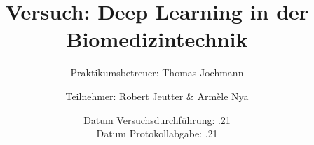 \documentclass[a4paper,10pt,titlepage]{scrartcl}
\begin{document}
\titlehead
{
    \small
    {
        Technische Universität Ilmenau\\
        Fakultät für Informatik und Automatisierung\\
        Institut für Biomedizinische Technik und Informatik\\

        Laborpraktikum BMT\\
        WS 2021/22}
}

\title {Versuch: Deep Learning in der Biomedizintechnik}
\subtitle{Praktikumsbetreuer: Thomas Jochmann}
\author{Teilnehmer: Robert Jeutter \& Armèle Nya}
\date{
    Datum Versuchsdurchführung: .21\\
    Datum Protokollabgabe: .21
}
\maketitle

\pagestyle{fancy}
\newpage
\end{document}
